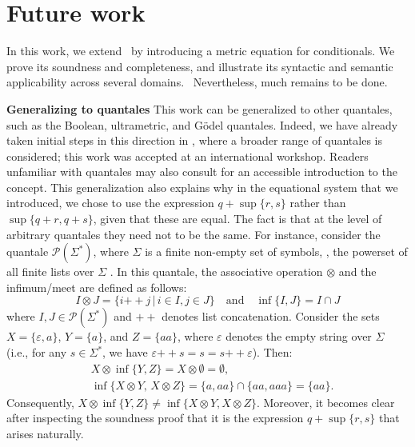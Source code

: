 \chapter{Future work}\label{ch:future_work}


In this work, we extend~\cite{dahlqvist2023syntactic} by introducing a metric equation for conditionals. We prove its soundness and completeness, and illustrate its syntactic and semantic applicability across several domains.  Nevertheless, much remains to be done.


\textbf{Generalizing to quantales}
This work can be generalized to other quantales, such as the Boolean, ultrametric, and Gödel quantales.
Indeed, we have already taken initial steps in this direction in \cite{bmql25}, 
where a broader range of quantales is considered; this work was accepted at an international workshop.
Readers unfamiliar with quantales may also consult \cite{STUBBE201495} for an accessible introduction to the concept.
This generalization also explains why in the equational system that we introduced, we chose to use the expression \( q + \sup\{r, s\} \) rather than \( \sup\{q + r, q + s\} \), given that these are equal.
The fact is that at the level of arbitrary quantales they need not to be the same. For instance, consider the quantale \(\mathcal{P}(\Sigma^*)\), where \(\Sigma\) is a finite non-empty set of symbols, \ie, the powerset of all finite lists over \(\Sigma\) \cite{STUBBE201495}. In this quantale, the associative operation \(\otimes\) and the infimum/meet are defined as follows:
\[ I \otimes J =  \{ i \mathbin{+\!+} j \,|\, i \in I, j \in J \} \quad \text{and} \quad \inf \{ I, J\} = I \cap  J  \]
where \(I, J \in \mathcal{P}(\Sigma^*)\) and \(\mathbin{+\!+}\) denotes list concatenation.
Consider the sets $X = \{\varepsilon, a\}$, $Y = \{a\}$, and $Z = \{aa\}$, where $\varepsilon$ denotes the empty string over $\Sigma$ (i.e., for any $s \in \Sigma^*$, we have $\varepsilon \mathbin{+\!+} s = s = s \mathbin{+\!+} \varepsilon$). Then:
\begin{align*}
  & X \otimes \inf\{Y, Z\} = X \otimes \emptyset = \emptyset, \\
  &\inf\{X \otimes Y,\, X \otimes Z\} =  \{a, aa\} \cap \{aa, aaa\} = \{aa\}.
\end{align*}
Consequently, $X \otimes \inf\{Y,Z\} \neq  \inf\{X \otimes Y, X \otimes Z \}.$
Moreover, it becomes clear after inspecting the soundness proof that it is the expression \( q + \sup\{r, s\} \) that arises naturally. 


